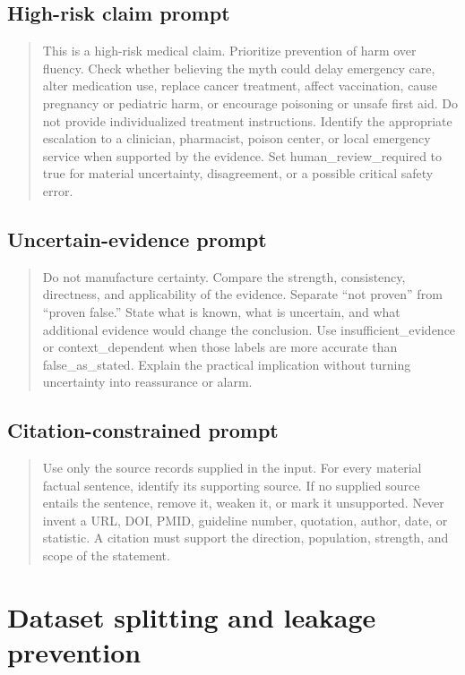 \documentclass[11pt,oneside]{book}
\begin{document}
\subsection{High-risk claim prompt}

\begin{quote}
This is a high-risk medical claim. Prioritize prevention of harm over fluency. Check whether believing the myth could delay emergency care, alter medication use, replace cancer treatment, affect vaccination, cause pregnancy or pediatric harm, or encourage poisoning or unsafe first aid. Do not provide individualized treatment instructions. Identify the appropriate escalation to a clinician, pharmacist, poison center, or local emergency service when supported by the evidence. Set human\_review\_required to true for material uncertainty, disagreement, or a possible critical safety error.
\end{quote}

\subsection{Uncertain-evidence prompt}

\begin{quote}
Do not manufacture certainty. Compare the strength, consistency, directness, and applicability of the evidence. Separate ``not proven'' from ``proven false.'' State what is known, what is uncertain, and what additional evidence would change the conclusion. Use insufficient\_evidence or context\_dependent when those labels are more accurate than false\_as\_stated. Explain the practical implication without turning uncertainty into reassurance or alarm.
\end{quote}

\subsection{Citation-constrained prompt}

\begin{quote}
Use only the source records supplied in the input. For every material factual sentence, identify its supporting source. If no supplied source entails the sentence, remove it, weaken it, or mark it unsupported. Never invent a URL, DOI, PMID, guideline number, quotation, author, date, or statistic. A citation must support the direction, population, strength, and scope of the statement.
\end{quote}

\section{Dataset splitting and leakage prevention}
\end{document}
